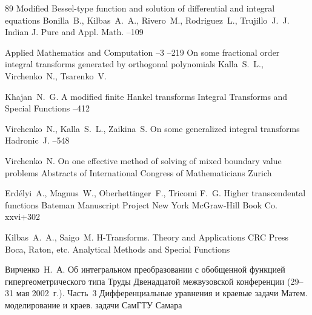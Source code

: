 \begin{thebibliography}{89}
\paper Modified Bessel-type function and solution of differential and integral equations
\by Bonilla~B., Kilbas~A.~A., Rivero~M., Rodriguez~L., Trujillo~J.~J.
\jour Indian J. Pure and Appl. Math.
--109

\jour Applied Mathematics and Computation
–3
–219
\paper On some fractional order integral transforms generated by orthogonal polynomials
\by Kalla~S.~L.,     Virchenko~N.,   Tsarenko~V.

\by Khajan~N.~G.
\paper A modified finite Hankel  transforms 
\jour Integral Transforms and Special Functions
--412


\by Virchenko~N., Kalla~S.~L., Zaikina~S.
\paper On some generalized integral transforms
\jour Hadronic~J. 
--548 


\by Virchenko~N. 
\paper On one effective method of solving of mixed boundary value problems 
\inbook Abstracts  of International Congress of Mathematicians
\publaddr Zurich

\by Erd\'elyi~A., Magnus~W., Oberhettinger~F., Tricomi F.~G.
\book Higher transcendental functions
\serial Bateman Manuscript Project
\publaddr New York
\publ McGraw-Hill Book Co.
\totalpages xxvi+302 

\by Kilbas~A.~A., Saigo~M.
\book H-Transforms. Theory and Applications
\publ CRC Press 
\publaddr Boca, Raton, etc.
\serial  Analytical Methods and Special Functions 

\by Вирченко~Н.~А.
\paper Об интегральном преобразовании с обобщенной функцией гипергеометрического типа 
\inbook Труды Двенадцатой межвузовской конференции \rm (29--31 мая 2002~г.). Часть~3
\bookinfo Дифференциальные уравнения и краевые задачи
\serial Матем. моделирование и краев. задачи
\publ СамГТУ
\publaddr Самара


\end{thebibliography}


\RuDate	

\makeentitle

